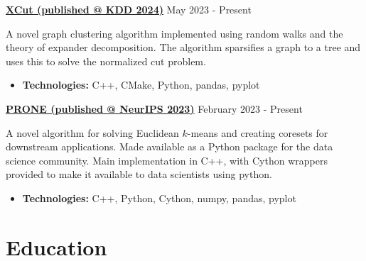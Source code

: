 \documentclass[a4paper, 10pt]{article}
\newcommand{\bulletSpace}{\vspace{-4pt}}
\newcommand{\secStartSpace}{\vspace{3pt}}
\newcommand{\secEndSpace}{\vspace{5pt}}
\newcommand{\spaceCollapse}{\vspace{-2pt}}
\newcommand{\projectHeader}[3]{
\noindent\href{#2}{\large\textbf{#1}} \hfill \normalsize#3 \vspace{2pt}
}
\begin{document}
\begin{addmargin}[0.5em]{1em}

		
	\projectHeader{XCut (published @ KDD 2024)}{https://gitlab.com/vietaa/xcut}{May 2023 - Present}
		
	\noindent A novel graph clustering algorithm implemented using random walks and the theory of expander decomposition.
	The algorithm sparsifies a graph to a tree and uses this to solve the normalized cut problem.
	\spaceCollapse
	\begin{itemize}
		\item \textbf{Technologies:} C++, CMake, Python, pandas, pyplot
		      \bulletSpace
	\end{itemize}

     \vspace{8pt}
 
	\projectHeader{PRONE (published @ NeurIPS 2023)}{https://github.com/boredoms/prone}{February 2023 - Present}
		
	\noindent A novel algorithm for solving Euclidean $k$-means and creating coresets for downstream applications. 
	Made available as a Python package for the data science community.
	Main implementation in C++, with Cython wrappers provided to make it available to data scientists using python.
	\spaceCollapse
	\begin{itemize}
		\item \textbf{Technologies:} C++, Python, Cython, numpy, pandas, pyplot
		      \bulletSpace
	\end{itemize}
\end{addmargin}
\secEndSpace
\secEndSpace


\section{\color{highlight} \textbf{Education}}
\secStartSpace
\end{document}
